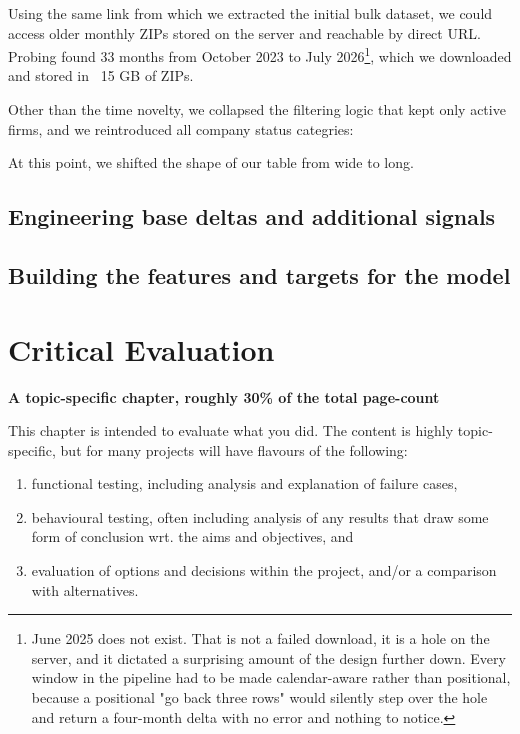 \documentclass[ %
                    author={Daniel Page},
                supervisor={Dr. Andrew Calway},
                    degree={MSc},
                     title={Some Structural Guidelines for Data Science MSc Theses, Including Those With Long Titles that Run Across Multiple Lines on the Front Page},
                  subtitle={And those including an optional subtitle too, for good measure},
                      type={},
                      year={2021}]{dissertation}
\begin{document}
Using the same link from which we extracted the initial bulk dataset, we could access older monthly ZIPs stored on the server and reachable by direct URL. Probing found 33 months from October 2023 to July 2026\footnote{June 2025 does not exist. That is not a failed download, it is a hole on the server, and it dictated a surprising amount of the design further down. Every window in the pipeline had to be made calendar-aware rather than positional, because a positional "go back three rows" would silently step over the hole and return a four-month delta with no error and nothing to notice.}, which we downloaded and stored in ~15 GB of ZIPs.

Other than the time novelty, we collapsed the filtering logic that kept only active firms, and we reintroduced all company status categries:

At this point, we shifted the shape of our table from wide to long.


\section{Engineering base deltas and additional signals}
\section{Building the features and targets for the model}



\chapter{Critical Evaluation}
\label{chap:evaluation}

{\bf A topic-specific chapter, roughly 30\% of the total page-count} 
\vspace{1cm} 

\noindent
This chapter is intended to evaluate what you did.  The content is highly 
topic-specific, but for many projects will have flavours of the following:

\begin{enumerate}
\item functional  testing, including analysis and explanation of failure 
      cases,
\item behavioural testing, often including analysis of any results that 
      draw some form of conclusion wrt. the aims and objectives,
      and
\item evaluation of options and decisions within the project, and/or a
      comparison with alternatives.
\end{enumerate}
\end{document}
